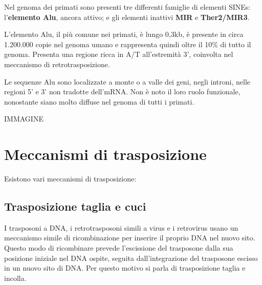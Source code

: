 \documentclass[11pt]{book}
\begin{document}
Nel genoma dei primati sono presenti tre differenti famiglie di elementi
SINEs: l'\textbf{elemento Alu}, ancora attivo; e gli elementi inattivi
\textbf{MIR} e \textbf{Ther2/MIR3}.

L'elemento Alu, il più comune nei primati, è lungo 0,3kb, è presente in
circa 1.200.000 copie nel genoma umano e rappresenta quindi oltre il
10\% di tutto il genoma. Presenta una regione ricca in A/T all'estremità
3', coinvolta nel meccanismo di retrotrasposizione.

Le sequenze Alu sono localizzate a monte o a valle dei geni, negli
introni, nelle regioni 5' e 3' non tradotte dell'mRNA. Non è noto il
loro ruolo funzionale, nonostante siano molto diffuse nel genoma di
tutti i primati.

IMMAGINE

\section{Meccanismi di
trasposizione}\label{meccanismi-di-trasposizione}

Esistono vari meccanismi di trasposizione:

\subsection{Trasposizione taglia e cuci}

I trasposoni a DNA, i retrotrasposoni simili a
virus e i retrovirus usano un meccanismo simile di ricombinazione per
inserire il proprio DNA nel nuovo sito. Questo modo di ricombinare
prevede l'escissione del trasposone dalla sua posizione iniziale nel
DNA ospite, seguita dall'integrazione del trasposone escisso in un
nuovo sito di DNA. Per questo motivo si parla di trasposizione taglia
e incolla.
\end{document}
